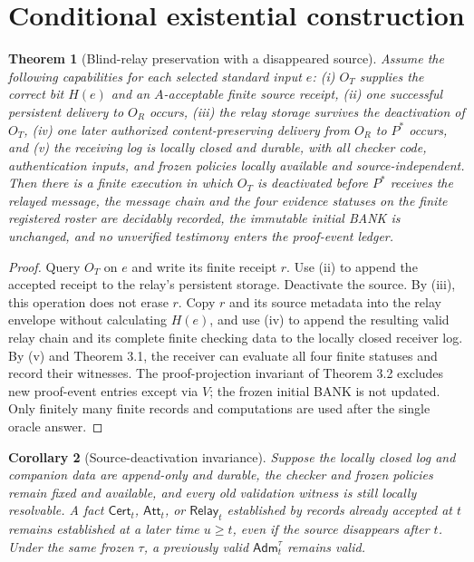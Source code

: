 \documentclass[11pt,letterpaper]{article}
\newtheorem{theorem}{Theorem}[section]\newtheorem{lemma}[theorem]{Lemma}\newtheorem{proposition}[theorem]{Proposition}\newtheorem{corollary}[theorem]{Corollary}\theoremstyle{definition}\newtheorem{definition}[theorem]{Definition}\newtheorem{example}[theorem]{Example}\newtheorem{remark}[theorem]{Remark}\newtheorem{conjecture}[theorem]{Conjecture}
\newcommand{\Cert}{\mathsf{Cert}}\newcommand{\Att}{\mathsf{Att}}\newcommand{\Relay}{\mathsf{Relay}}\newcommand{\Auth}{\mathsf{Auth}}\newcommand{\Trust}{\mathsf{Trusted}}\newcommand{\Adm}{\mathsf{Adm}}\newcommand{\Proof}{\mathsf{Proof}}\newcommand{\Msg}{\mathsf{Msg}}\newcommand{\Log}{\mathcal L}\newcommand{\N}{\mathbb N}
\begin{document}
\section{Conditional existential construction}
\begin{theorem}[Blind-relay preservation with a disappeared source]
Assume the following capabilities for each selected standard input $e$: (i) $O_T$ supplies the correct bit $H(e)$ and an $A$-acceptable finite source receipt, (ii) one successful persistent delivery to $O_R$ occurs, (iii) the relay storage survives the deactivation of $O_T$, (iv) one later authorized content-preserving delivery from $O_R$ to $P^*$ occurs, and (v) the receiving log is locally closed and durable, with all checker code, authentication inputs, and frozen policies locally available and source-independent. Then there is a finite execution in which $O_T$ is deactivated before $P^*$ receives the relayed message, the message chain and the four evidence statuses on the finite registered roster are decidably recorded, the immutable initial BANK is unchanged, and no unverified testimony enters the proof-event ledger.
\end{theorem}
\begin{proof}
Query $O_T$ on $e$ and write its finite receipt $r$. Use (ii) to append the accepted receipt to the relay's persistent storage. Deactivate the source. By (iii), this operation does not erase $r$. Copy $r$ and its source metadata into the relay envelope without calculating $H(e)$, and use (iv) to append the resulting valid relay chain and its complete finite checking data to the locally closed receiver log. By (v) and Theorem 3.1, the receiver can evaluate all four finite statuses and record their witnesses. The proof-projection invariant of Theorem 3.2 excludes new proof-event entries except via $V$; the frozen initial BANK is not updated. Only finitely many finite records and computations are used after the single oracle answer.
\end{proof}
\begin{corollary}[Source-deactivation invariance]
Suppose the locally closed log and companion data are append-only and durable, the checker and frozen policies remain fixed and available, and every old validation witness is still locally resolvable. A fact $\Cert_t$, $\Att_t$, or $\Relay_t$ established by records already accepted at $t$ remains established at a later time $u\ge t$, even if the source disappears after $t$. Under the same frozen $\tau$, a previously valid $\Adm_t^\tau$ remains valid.
\end{corollary}
\end{document}
